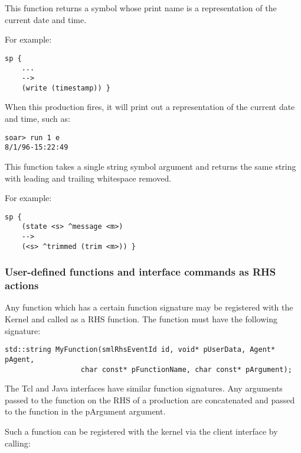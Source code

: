 \begin{description}
\item [\soarb{timestamp} --- ] This function returns a symbol whose print name 
is a
representation of the current date and time. 

For example:

\begin{verbatim}
sp {
    ...
    -->
    (write (timestamp)) }
\end{verbatim}

When this production fires, it will print out a representation of the
current date and time, such as:
\begin{verbatim}
soar> run 1 e
8/1/96-15:22:49
\end{verbatim}


\item [\soarb{trim} --- ] This function takes a single string symbol argument
and returns the same string with leading and trailing whitespace removed.

For example:

\begin{verbatim}
sp {
    (state <s> ^message <m>)
    -->
    (<s> ^trimmed (trim <m>)) }
\end{verbatim}

\end{description}

\subsubsection{User-defined functions and interface commands as RHS actions}

Any function which has a certain function signature may be registered with the
Kernel and called as a RHS function.  The function must have the following signature:

\begin{verbatim}
std::string MyFunction(smlRhsEventId id, void* pUserData, Agent* pAgent,
                  char const* pFunctionName, char const* pArgument);
\end{verbatim}

The Tcl and Java interfaces have similar function signatures. Any arguments passed
to the function on the RHS of a production are concatenated and passed to the function
in the pArgument argument.

Such a function can be registered with the kernel via the client interface by calling:


